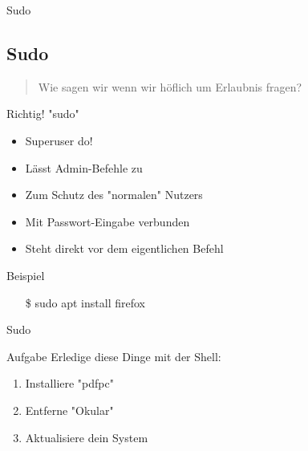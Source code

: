 \begin{frame}{Sudo}
    \subsection{Sudo}\label{subsec:sudo}

    \begin{quote}
        Wie sagen wir wenn wir höflich um Erlaubnis fragen?
    \end{quote}

    \textrightarrow Richtig! "sudo"

    \begin{itemize}
        \item Superuser do!
        \item Lässt Admin-Befehle zu
        \item Zum Schutz des "normalen" Nutzers
        \item Mit Passwort-Eingabe verbunden
        \item Steht direkt vor dem eigentlichen Befehl
    \end{itemize}

    \vspace{0.5cm}
    \begin{exampleblock}{Beispiel}
        \begin{itemize}
            \item[\$] sudo apt install firefox
        \end{itemize}
    \end{exampleblock}

\end{frame}

\begin{frame}{Sudo}
    \begin{alertblock}{Aufgabe}
        Erledige diese Dinge mit der Shell:
        \begin{enumerate}
            \item Installiere "pdfpc"
            \item Entferne "Okular"
            \item Aktualisiere dein System
        \end{enumerate}
    \end{alertblock}
\end{frame}

